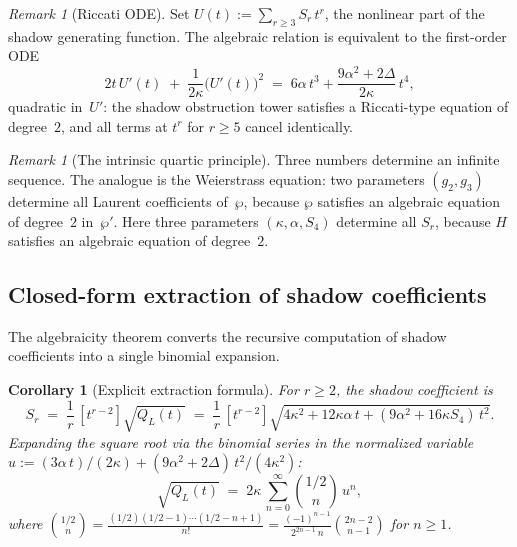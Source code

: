 \documentclass[11pt,reqno]{amsart}
\newtheorem{corollary}[theorem]{Corollary}
\theoremstyle{definition}
\theoremstyle{remark}
\newtheorem{remark}[theorem]{Remark}
\numberwithin{equation}{section}
\begin{document}
\begin{remark}[Riccati ODE]\label{rem:riccati-ode}
Set $U(t) := \sum_{r \ge 3} S_r\, t^r$, the nonlinear part
of the shadow generating function. The algebraic
relation is equivalent to the first-order ODE
\begin{equation}\label{eq:riccati-ode}
 2t\, U'(t) \;+\; \frac{1}{2\kappa}\bigl(U'(t)\bigr)^2
 \;=\; 6\alpha\, t^3
 + \frac{9\alpha^2 + 2\Delta}{2\kappa}\, t^4,
\end{equation}
quadratic in~$U'$: the shadow obstruction tower satisfies a
Riccati-type equation of degree~$2$, and all terms at
$t^r$ for $r \ge 5$ cancel identically.
\end{remark}

\begin{remark}[The intrinsic quartic
principle]\label{rem:quartic-principle}
Three numbers determine an infinite sequence. The analogue is
the Weierstrass equation: two parameters $(g_2, g_3)$
determine all Laurent coefficients of~$\wp$, because $\wp$
satisfies an algebraic equation of degree~$2$
in~$\wp'$. Here three parameters
$(\kappa, \alpha, S_4)$ determine all $S_r$, because $H$
satisfies an algebraic equation of degree~$2$.
\end{remark}


\subsection{Closed-form extraction of shadow
coefficients}\label{subsec:closed-form}

The algebraicity theorem converts the recursive computation
of shadow coefficients into a single binomial expansion.

\begin{corollary}[Explicit extraction
formula]\label{cor:extraction}
For $r \ge 2$, the shadow coefficient is
\[
 S_r
 \;=\;
 \frac{1}{r}\,[t^{r-2}]\sqrt{Q_L(t)}
 \;=\;
 \frac{1}{r}\,[t^{r-2}]
 \sqrt{4\kappa^2 + 12\kappa\alpha\, t
 + (9\alpha^2 + 16\kappa S_4)\, t^2}.
\]
Expanding the square root via the binomial series in the
normalized variable
$u := (3\alpha\, t)/(2\kappa) + (9\alpha^2 + 2\Delta)\,
t^2/(4\kappa^2)$:
\begin{equation}\label{eq:binomial-extraction}
 \sqrt{Q_L(t)}
 \;=\;
 2\kappa\,\sum_{n=0}^{\infty}
 \binom{1/2}{n}\, u^n,
\end{equation}
where $\binom{1/2}{n} = \frac{(1/2)(1/2 - 1)
\cdots(1/2 - n + 1)}{n!}
= \frac{(-1)^{n-1}}{2^{2n-1}\,n}\binom{2n-2}{n-1}$
for $n \ge 1$.
\end{corollary}
\end{document}
